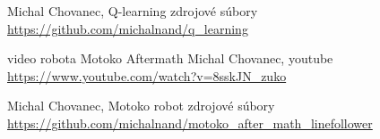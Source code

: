 \begin{thebibliography}{99}                                \label{literatura}


 Michal Chovanec, Q-learning zdrojové súbory \url{https://github.com/michalnand/q_learning}

 video robota Motoko Aftermath
Michal Chovanec, youtube
\url{https://www.youtube.com/watch?v=8sskJN_zuko}

 Michal Chovanec, Motoko robot zdrojové súbory \url{https://github.com/michalnand/motoko_after_math_linefollower}


\end{thebibliography}

